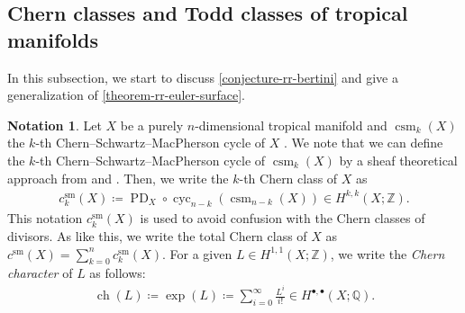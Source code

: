 \documentclass[a4paper,dvipdfmx,reqno,12pt]{amsart}
\theoremstyle{definition}
\newtheorem{notation}[theorem]{Notation}
\newcommand{\deq}{\coloneqq}
\newcommand{\opn}[1]{\operatorname{#1}}
\numberwithin{equation}{section}
\begin{document}
\subsection{Chern classes and Todd classes of
tropical manifolds}
In this subsection, we start to discuss
\cref{conjecture-rr-bertini} and give a generalization
of \cref{theorem-rr-euler-surface}.

\begin{notation}
Let $X$ be a purely $n$-dimensional tropical manifold
and $\opn{csm}_{k}(X)$ the $k$-th
Chern--Schwartz--MacPherson cycle of $X$
\cite[Definition 3.4]{demedrano2023chern}.
We note that we can define
the $k$-th Chern--Schwartz--MacPherson
cycle of $\opn{csm}_{k}(X)$ by a sheaf
theoretical approach  
from \cite[Proposition 3.11 and Lemma 3.12]{demedrano2023chern}
and \cite[Lemma 4.13]{MR4637248}.
Then, we write the $k$-th Chern class of $X$ as
\begin{align}
c_{k}^{\mathrm{sm}}(X)\deq
\opn{PD}_X\circ \opn{cyc}_{n-k}(\opn{csm}_{n-k}(X))
\in H^{k,k}(X;\mathbb{Z}).
\end{align}
This notation $c_{k}^{\mathrm{sm}}(X)$
is used to avoid confusion with the Chern classes of divisors.
As like this, we write the total Chern class of $X$ as
$c^{\mathrm{sm}}(X)=\sum_{k=0}^{n} c_{k}^{\mathrm{sm}}(X)$.
For a given $L\in H^{1,1}(X;\mathbb{Z})$, we write
the \emph{Chern character} of $L$ as follows:
\begin{align}
\opn{ch}(L)\deq \opn{exp}(L)
\deq \sum_{i=0}^{\infty}\frac{L^{i}}{i!}\in 
H^{\bullet,\bullet}(X;\mathbb{Q}).
\end{align}
\end{notation}
\end{document}
